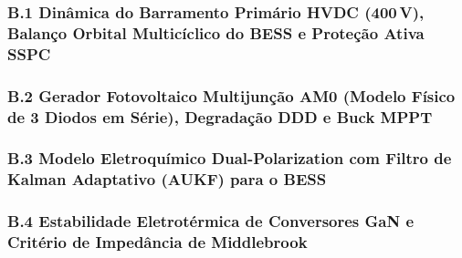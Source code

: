 \vspace{0.6cm}
\vspace{0.6cm}
\subsubsection*{B.1 Dinâmica do Barramento Primário HVDC (400\,V), Balanço Orbital Multicíclico do BESS e Proteção Ativa SSPC}


\vspace{0.6cm}
\subsubsection*{B.2 Gerador Fotovoltaico Multijunção AM0 (Modelo Físico de 3 Diodos em Série), Degradação DDD e Buck MPPT}


\vspace{0.6cm}
\subsubsection*{B.3 Modelo Eletroquímico Dual-Polarization com Filtro de Kalman Adaptativo (AUKF) para o BESS}


\vspace{0.6cm}
\subsubsection*{B.4 Estabilidade Eletrotérmica de Conversores GaN e Critério de Impedância de Middlebrook}


